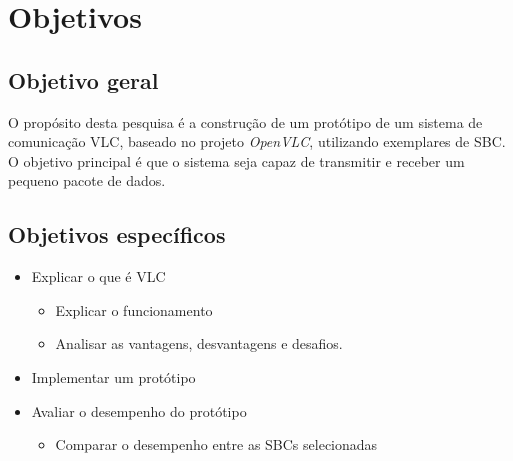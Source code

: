 \chapter{Objetivos}
\section{Objetivo geral}

O propósito desta pesquisa é a construção de um protótipo de um sistema de
comunicação VLC, baseado no projeto \textit{OpenVLC}, utilizando exemplares de SBC. O objetivo principal é que o sistema seja capaz de transmitir e receber um pequeno pacote de dados.

\section{Objetivos específicos}

\begin{itemize}

  \item Explicar o que é VLC
    \begin{itemize}
      \item Explicar o funcionamento
      \item Analisar as vantagens, desvantagens e desafios.
    \end{itemize}

  \item Implementar um protótipo
  \item Avaliar o desempenho do protótipo
    \begin{itemize}
      \item Comparar o desempenho entre as SBCs selecionadas
    \end{itemize}

\end{itemize}

